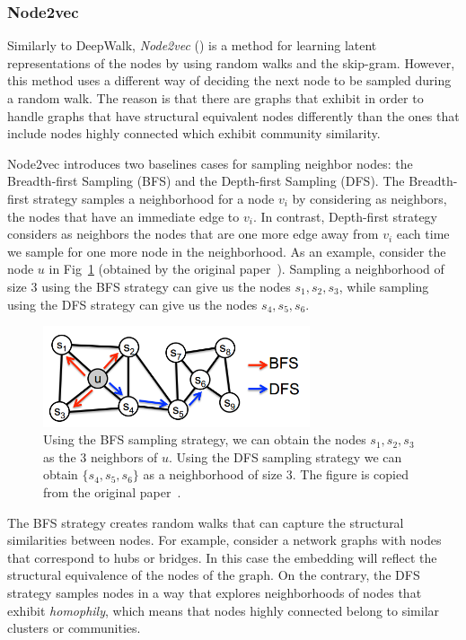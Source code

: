 \subsubsection{Node2vec}

Similarly to DeepWalk, \emph{Node2vec} (\cite{grover2016node2vec}) is a method
for learning latent representations of the nodes by using random walks and the
skip-gram. However, this method uses a different way of deciding the next node
to be sampled during a random walk. The reason is that there are graphs that
exhibit in order to handle graphs that have
structural equivalent nodes differently than the ones that include nodes
highly connected which exhibit community similarity.

Node2vec introduces two baselines cases for sampling neighbor nodes: the
Breadth-first Sampling (BFS) and the Depth-first Sampling (DFS).
The Breadth-first strategy samples a neighborhood for a node $v_i$ by
considering as neighbors, the nodes that have an immediate edge to $v_i$.
In contrast, Depth-first strategy considers as neighbors the nodes that are
one more edge away from $v_i$ each time we sample for one more node in the
neighborhood. As an example, consider the node $u$ in
Fig~\ref{sampling_strategies} (obtained by the original
paper~\cite{grover2016node2vec}). Sampling a neighborhood of size 3 using the
BFS strategy can give us the nodes $s_1, s_2, s_3$, while sampling using the DFS
strategy can give us the nodes $s_4, s_5, s_6$.
\begin{figure}
\begin{center}
\includegraphics[width=0.7\textwidth]{figures/sampling.png}
\end{center}
\caption{Using the BFS sampling strategy, we can obtain the nodes
$s_1, s_2, s_3$ as the 3 neighbors of $u$. Using the DFS sampling strategy we
can obtain $\{s_4, s_5, s_6\}$ as a neighborhood of size 3. The figure is copied
from the original paper~\cite{grover2016node2vec}.}
\label{sampling_strategies}
\end{figure}
The BFS strategy creates random walks that can capture the structural similarities
between nodes. For example, consider a network graphs with nodes that correspond
to hubs or bridges. In this case the embedding will reflect the structural
equivalence of the nodes of the graph.
On the contrary, the DFS strategy samples nodes in a way that explores
neighborhoods of nodes that exhibit \emph{homophily}, which means that nodes
highly connected belong to similar clusters or communities.


